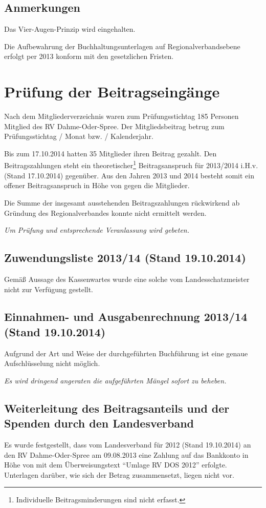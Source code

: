 \documentclass[%
	titlepage,oneside,12pt,headlines=1.5,numbers=noenddot, chapterprefix=false,parskip=full-,DIV=14,pagesize]{scrreprt}
\begin{document}
\subsection{Anmerkungen}
Das Vier-Augen-Prinzip wird eingehalten.

Die Aufbewahrung der Buchhaltungsunterlagen auf Regionalverbandsebene erfolgt per 2013 konform mit den gesetzlichen Fristen.

\section{Prüfung der Beitragseingänge}
Nach dem Mitgliederverzeichnis waren zum Prüfungsstichtag 185 Personen Mitglied des RV Dahme-Oder-Spree. Der Mitgliedsbeitrag betrug zum Prüfungsstichtag  / Monat bzw.  / Kalenderjahr.

Bis zum 17.10.2014 hatten 35 Mitglieder ihren Beitrag gezahlt. Den Beitragszahlungen steht ein theoretischer\footnote{Individuelle Beitragsminderungen sind nicht erfasst.} Beitragsanspruch für 2013/2014 i.H.v.  (Stand 17.10.2014) gegenüber. Aus den Jahren 2013 und 2014 besteht somit ein offener Beitragsanspruch in Höhe von  gegen die Mitglieder. 

Die Summe der insgesamt ausstehenden Beitragszahlungen rückwirkend ab Gründung des Regionalverbandes konnte nicht ermittelt werden.

\textit{Um Prüfung und entsprechende Veranlassung wird gebeten.}

\subsection{Zuwendungsliste 2013/14 (Stand 19.10.2014)}
Gemäß Aussage des Kassenwartes wurde eine solche vom Landesschatzmeister nicht zur Verfügung gestellt.

\subsection{Einnahmen- und Ausgabenrechnung 2013/14 (Stand 19.10.2014)}
Aufgrund der Art und Weise der durchgeführten Buchführung ist eine genaue Aufschlüsselung nicht möglich.

\textit{Es wird dringend angeraten die aufgeführten Mängel sofort zu beheben.}


\subsection{Weiterleitung des Beitragsanteils und der Spenden durch den Landesverband}
Es wurde festgestellt, dass vom Landesverband für 2012 (Stand 19.10.2014) an den RV Dahme-Oder-Spree am 09.08.2013 eine Zahlung auf das Bankkonto in Höhe von  mit dem Überweisungstext \enquote{Umlage RV DOS 2012} erfolgte. Unterlagen darüber, wie sich der Betrag zusammensetzt, liegen nicht vor.
\end{document}

